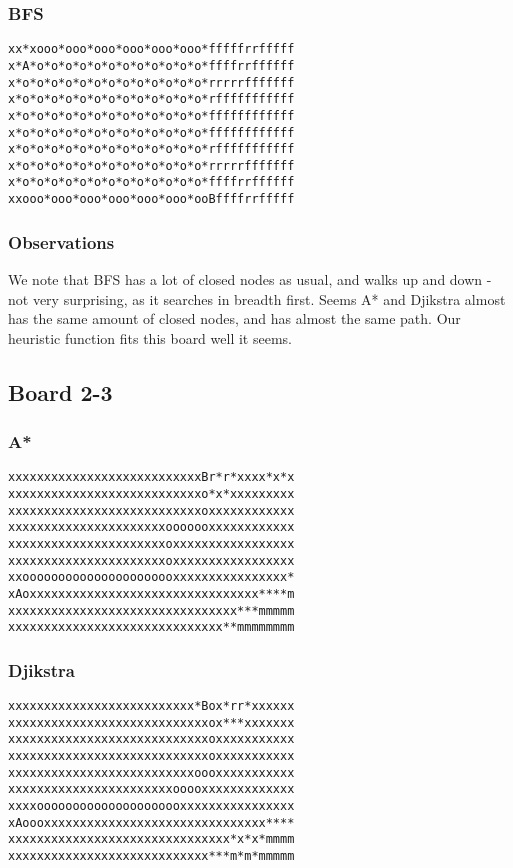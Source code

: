 \documentclass[11pt,a4paper]{article}
\begin{document}
\subsubsection*{BFS}
\begin{lstlisting}
xx*xooo*ooo*ooo*ooo*ooo*ooo*fffffrrfffff
x*A*o*o*o*o*o*o*o*o*o*o*o*o*ffffrrffffff
x*o*o*o*o*o*o*o*o*o*o*o*o*o*rrrrrfffffff
x*o*o*o*o*o*o*o*o*o*o*o*o*o*rfffffffffff
x*o*o*o*o*o*o*o*o*o*o*o*o*o*ffffffffffff
x*o*o*o*o*o*o*o*o*o*o*o*o*o*ffffffffffff
x*o*o*o*o*o*o*o*o*o*o*o*o*o*rfffffffffff
x*o*o*o*o*o*o*o*o*o*o*o*o*o*rrrrrfffffff
x*o*o*o*o*o*o*o*o*o*o*o*o*o*ffffrrffffff
xxooo*ooo*ooo*ooo*ooo*ooo*ooBffffrrfffff
\end{lstlisting}
\subsubsection*{Observations}
We note that BFS has a lot of closed nodes as usual, and walks up and down - not very surprising, as it searches in breadth first. Seems A* and Djikstra almost has the same amount of closed nodes, and has almost the same path. Our heuristic function fits this board well it seems.

\subsection*{Board 2-3}
\subsubsection*{A*}
\begin{lstlisting}
xxxxxxxxxxxxxxxxxxxxxxxxxxxBr*r*xxxx*x*x
xxxxxxxxxxxxxxxxxxxxxxxxxxxo*x*xxxxxxxxx
xxxxxxxxxxxxxxxxxxxxxxxxxxxoxxxxxxxxxxxx
xxxxxxxxxxxxxxxxxxxxxxooooooxxxxxxxxxxxx
xxxxxxxxxxxxxxxxxxxxxxoxxxxxxxxxxxxxxxxx
xxxxxxxxxxxxxxxxxxxxxxoxxxxxxxxxxxxxxxxx
xxoooooooooooooooooooooxxxxxxxxxxxxxxxx*
xAoxxxxxxxxxxxxxxxxxxxxxxxxxxxxxxxx****m
xxxxxxxxxxxxxxxxxxxxxxxxxxxxxxxx***mmmmm
xxxxxxxxxxxxxxxxxxxxxxxxxxxxxx**mmmmmmmm
\end{lstlisting}
\subsubsection*{Djikstra}

\begin{lstlisting}
xxxxxxxxxxxxxxxxxxxxxxxxxx*Box*rr*xxxxxx
xxxxxxxxxxxxxxxxxxxxxxxxxxxxox***xxxxxxx
xxxxxxxxxxxxxxxxxxxxxxxxxxxxoxxxxxxxxxxx
xxxxxxxxxxxxxxxxxxxxxxxxxxxxoxxxxxxxxxxx
xxxxxxxxxxxxxxxxxxxxxxxxxxoooxxxxxxxxxxx
xxxxxxxxxxxxxxxxxxxxxxxooooxxxxxxxxxxxxx
xxxxooooooooooooooooooooxxxxxxxxxxxxxxxx
xAoooxxxxxxxxxxxxxxxxxxxxxxxxxxxxxxx****
xxxxxxxxxxxxxxxxxxxxxxxxxxxxxxx*x*x*mmmm
xxxxxxxxxxxxxxxxxxxxxxxxxxxx***m*m*mmmmm
\end{lstlisting}
\end{document}
